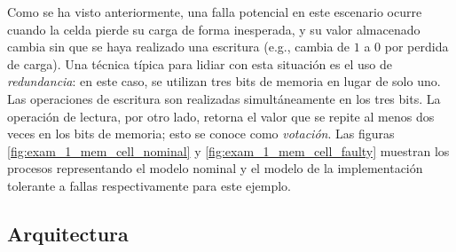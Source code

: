 Como se ha visto anteriormente, una falla potencial en este escenario ocurre cuando la celda pierde su carga de forma inesperada, y su valor almacenado cambia sin que se haya realizado una escritura (e.g., cambia de $1$ a $0$ por perdida de carga). Una técnica típica para lidiar con esta situación es el uso de \emph{redundancia}: 
en este caso, se utilizan tres bits de memoria en lugar de solo uno. Las operaciones de escritura son realizadas simultáneamente en los tres bits. 
La operación de lectura, por otro lado, retorna el valor que se repite al menos dos veces en los bits de memoria; esto se conoce como \emph{votación}. 
Las figuras \ref{fig:exam_1_mem_cell_nominal} y \ref{fig:exam_1_mem_cell_faulty} muestran los procesos representando el modelo nominal y el modelo de la implementación tolerante a fallas respectivamente para este ejemplo. 

\subsection{Arquitectura}

